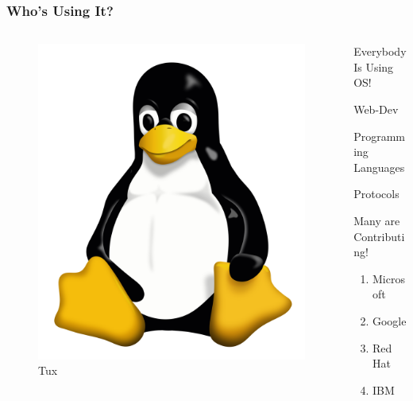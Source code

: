 \documentclass{beamer}
\begin{document}
\begin{frame}
  \frametitle{Who's Using It?}
  \begin{columns}
    \begin{column}{0.5\textwidth}
      \begin{center}
        \begin{figure}
          \includegraphics[scale=0.06]{./img/tux.png}
          \caption{Tux}
        \end{figure}
      \end{center}
    \end{column}
    \begin{column}{0.4\textwidth}
      \begin{block}{Everybody Is Using OS!}
        
        Web-Dev
        
        Programming Languages

        Protocols
      \end{block}
      \begin{exampleblock}{Many are Contributing!}
        \begin{enumerate}
        \item Microsoft
        \item Google
        \item Red Hat
        \item IBM
        \end{enumerate}
      \end{exampleblock}
    \end{column}
  \end{columns}
\end{frame}
\end{document}
